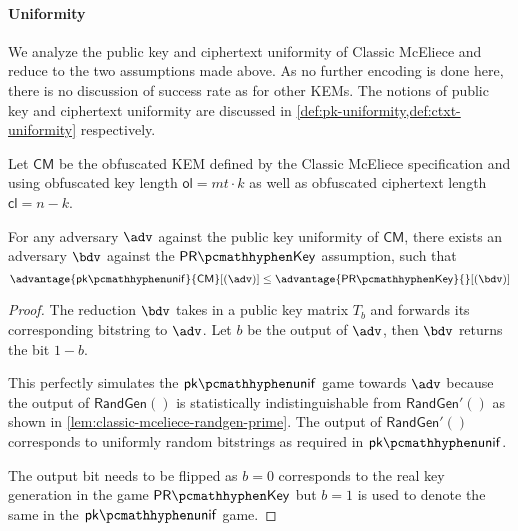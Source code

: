 \paragraph{Uniformity}

We analyze the public key and ciphertext uniformity of Classic McEliece and reduce to the two assumptions made above. As no further encoding is done here, there is no discussion of success rate as for other KEMs.
The notions of public key and ciphertext uniformity are discussed in \cref{def:pk-uniformity,def:ctxt-uniformity} respectively.

\begin{lemma} \label{lem:classic-mceliece-pk-unif}
    Let $\textsf{CM}$ be the obfuscated KEM defined by the Classic McEliece specification \cite{NISTPQC-R4:ClassicMcEliece22} and using obfuscated key length $\textsf{ol} = mt \cdot k$ as well as obfuscated ciphertext length $\textsf{cl} = n-k$.
    
    For any adversary $\adv$ against the public key uniformity of $\textsf{CM}$, there exists an adversary $\bdv$ against the $\prkey$ assumption, such that
    \[ \advantage{\pkunif}{\textsf{CM}}[(\adv)] \leq \advantage{\prkey}{}[(\bdv)] \]
\end{lemma}
\begin{proof}
    The reduction $\bdv$ takes in a public key matrix $T_b$ and forwards its corresponding bitstring to $\adv$. Let $b$ be the output of $\adv$, then $\bdv$ returns the bit $1-b$.

    This perfectly simulates the $\pkunif$ game towards $\adv$ because the output of $\textsf{RandGen}()$ is statistically indistinguishable from $\textsf{RandGen}'()$ as shown in \cref{lem:classic-mceliece-randgen-prime}. The output of $\textsf{RandGen}'()$ corresponds to uniformly random bitstrings as required in $\pkunif$.

    The output bit needs to be flipped as $b=0$ corresponds to the real key generation in the game $\prkey$ but $b=1$ is used to denote the same in the $\pkunif$ game.
\end{proof}

